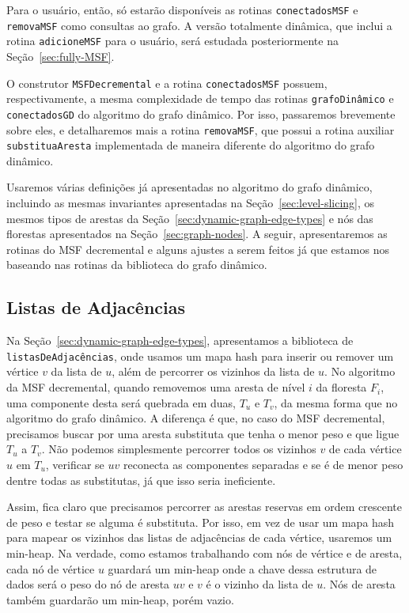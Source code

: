 Para o usuário, então, só estarão disponíveis as rotinas \texttt{conectadosMSF} e \texttt{removaMSF} como consultas ao grafo. A versão totalmente dinâmica, que inclui a rotina \texttt{adicioneMSF} para o usuário, será estudada posteriormente na Seção~\ref{sec:fully-MSF}.

O construtor \texttt{MSFDecremental} e a rotina \texttt{conectadosMSF} possuem, respectivamente, a mesma complexidade de tempo das rotinas \texttt{grafoDinâmico} e \texttt{conectadosGD} do algoritmo do grafo dinâmico. Por isso, passaremos brevemente sobre eles, e detalharemos mais a rotina \texttt{removaMSF}, que possui a rotina auxiliar \texttt{substituaAresta} implementada de maneira diferente do algoritmo do grafo dinâmico. 

Usaremos várias definições já apresentadas no algoritmo do grafo dinâmico, incluindo as mesmas invariantes apresentadas na Seção~\ref{sec:level-slicing}, os mesmos tipos de arestas da Seção~\ref{sec:dynamic-graph-edge-types} e nós das florestas apresentados na Seção~\ref{sec:graph-nodes}. A seguir, apresentaremos as rotinas do MSF decremental e alguns ajustes a serem feitos já que estamos nos baseando nas rotinas da biblioteca do grafo dinâmico. 

\subsection{Listas de Adjacências}
\label{sec:adjancency-lists-min-heap}

Na Seção~\ref{sec:dynamic-graph-edge-types}, apresentamos a biblioteca de \texttt{listasDeAdjacências}, onde usamos um mapa hash para inserir ou remover um vértice $v$ da lista de $u$, além de percorrer os vizinhos da lista de $u$. No algoritmo da MSF decremental, quando removemos uma aresta de nível $i$ da floresta $F_i$, uma componente desta será quebrada em duas, $T_u$ e $T_v$, da mesma forma que no algoritmo do grafo dinâmico. A diferença é que, no caso do MSF decremental, precisamos buscar por uma aresta substituta que tenha o menor peso e que ligue $T_u$ a $T_v$. Não podemos simplesmente percorrer todos os vizinhos $v$ de cada vértice $u$ em $T_u$, verificar se $uv$ reconecta as componentes separadas e se é de menor peso dentre todas as substitutas, já que isso seria ineficiente.

Assim, fica claro que precisamos percorrer as arestas reservas em ordem crescente de peso e testar se alguma é substituta. Por isso, em vez de usar um mapa hash para mapear os vizinhos das listas de adjacências de cada vértice, usaremos um min-heap. Na verdade, como estamos trabalhando com nós de vértice e de aresta, cada nó de vértice $u$ guardará um min-heap onde a chave dessa estrutura de dados será o peso do nó de aresta $uv$ e $v$ é o vizinho da lista de $u$. Nós de aresta também guardarão um min-heap, porém vazio. 

